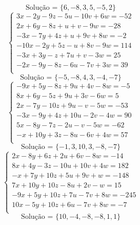 \documentclass[12pt,oneside,a4paper]{article}
\begin{document}
\begin{equation*}
\text{Solução = }\{6,-8,3,5,-5,2\}
\end{equation*}
\vspace{\baselineskip}
\begin{equation*}
\begin{cases}
3x-2y-9z-5u-10v+6w=-52 \\
2x+6y-8z+u+v-9w=-28 \\
-3x-7y+4z+u+9v+8w=-2 \\
-10x-2y+5z-u+8v-9w=114 \\
-3x+3y-z+7u+v-3w=25 \\
-2x-9y-8z-6u-7v+3w=39 \\
\end{cases}
\end{equation*}
\begin{equation*}
\text{Solução = }\{-5,-8,4,3,-4,-7\}
\end{equation*}
\vspace{\baselineskip}
\begin{equation*}
\begin{cases}
-9x+5y-8z+9u+4v-8w=-5 \\
8x+6y-5z+9u+3v-6w=5 \\
2x-7y-10z+9u-v-5w=-53 \\
-3x-9y+4z+10u-2v-4w=90 \\
5x-8y-7z-2u-v-5w=-62 \\
-x+10y+3z-8u-6v+4w=57 \\
\end{cases}
\end{equation*}
\begin{equation*}
\text{Solução = }\{-1,3,10,3,-8,-7\}
\end{equation*}
\vspace{\baselineskip}
\begin{equation*}
\begin{cases}
2x-8y+6z+2u+6v-8w=-14 \\
8x+4y-3z-10u+10v+4w=182 \\
-x+7y+10z+5u+9v+w=-148 \\
7x+10y+10z-8u+2v-w=15 \\
-9x+5y+10z+7u-7v+8w=-245 \\
10x-5y+10z+6u-7v+8w=-7 \\
\end{cases}
\end{equation*}
\begin{equation*}
\text{Solução = }\{10,-4,-8,-8,1,1\}
\end{equation*}
\end{document}
